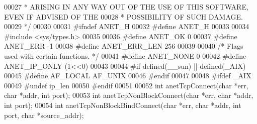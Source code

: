 \begin{DoxyCode}
00027 \textcolor{comment}{ * ARISING IN ANY WAY OUT OF THE USE OF THIS SOFTWARE, EVEN IF ADVISED OF THE}
00028 \textcolor{comment}{ * POSSIBILITY OF SUCH DAMAGE.}
00029 \textcolor{comment}{ */}
00030 
00031 \textcolor{preprocessor}{#}\textcolor{preprocessor}{ifndef} \textcolor{preprocessor}{ANET\_H}
00032 \textcolor{preprocessor}{#}\textcolor{preprocessor}{define} \textcolor{preprocessor}{ANET\_H}
00033 
00034 \textcolor{preprocessor}{#}\textcolor{preprocessor}{include} \textcolor{preprocessor}{<}\textcolor{preprocessor}{sys}\textcolor{preprocessor}{/}\textcolor{preprocessor}{types}\textcolor{preprocessor}{.}\textcolor{preprocessor}{h}\textcolor{preprocessor}{>}
00035 
00036 \textcolor{preprocessor}{#}\textcolor{preprocessor}{define} \textcolor{preprocessor}{ANET\_OK} 0
00037 \textcolor{preprocessor}{#}\textcolor{preprocessor}{define} \textcolor{preprocessor}{ANET\_ERR} \textcolor{preprocessor}{-}1
00038 \textcolor{preprocessor}{#}\textcolor{preprocessor}{define} \textcolor{preprocessor}{ANET\_ERR\_LEN} 256
00039 
00040 \textcolor{comment}{/* Flags used with certain functions. */}
00041 \textcolor{preprocessor}{#}\textcolor{preprocessor}{define} \textcolor{preprocessor}{ANET\_NONE} 0
00042 \textcolor{preprocessor}{#}\textcolor{preprocessor}{define} \textcolor{preprocessor}{ANET\_IP\_ONLY} \textcolor{preprocessor}{(}1\textcolor{preprocessor}{<<}0\textcolor{preprocessor}{)}
00043 
00044 \textcolor{preprocessor}{#}\textcolor{preprocessor}{if} \textcolor{preprocessor}{defined}\textcolor{preprocessor}{(}\textcolor{preprocessor}{\_\_sun}\textcolor{preprocessor}{)} \textcolor{preprocessor}{||} \textcolor{preprocessor}{defined}\textcolor{preprocessor}{(}\textcolor{preprocessor}{\_AIX}\textcolor{preprocessor}{)}
00045 \textcolor{preprocessor}{#}\textcolor{preprocessor}{define} \textcolor{preprocessor}{AF\_LOCAL} \textcolor{preprocessor}{AF\_UNIX}
00046 \textcolor{preprocessor}{#}\textcolor{preprocessor}{endif}
00047 
00048 \textcolor{preprocessor}{#}\textcolor{preprocessor}{ifdef} \textcolor{preprocessor}{\_AIX}
00049 \textcolor{preprocessor}{#}\textcolor{preprocessor}{undef} \textcolor{preprocessor}{ip\_len}
00050 \textcolor{preprocessor}{#}\textcolor{preprocessor}{endif}
00051 
00052 \textcolor{keywordtype}{int} anetTcpConnect(\textcolor{keywordtype}{char} *err, \textcolor{keywordtype}{char} *addr, \textcolor{keywordtype}{int} port);
00053 \textcolor{keywordtype}{int} anetTcpNonBlockConnect(\textcolor{keywordtype}{char} *err, \textcolor{keywordtype}{char} *addr, \textcolor{keywordtype}{int} port);
00054 \textcolor{keywordtype}{int} anetTcpNonBlockBindConnect(\textcolor{keywordtype}{char} *err, \textcolor{keywordtype}{char} *addr, \textcolor{keywordtype}{int} port, \textcolor{keywordtype}{char} *source\_addr);

\end{DoxyCode}
